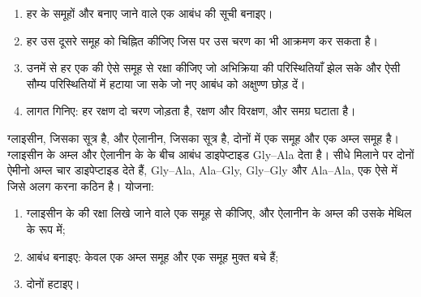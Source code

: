 \begin{method}[रक्षण की योजना]\label{met:g12:synthesis-strategy:plan}
\begin{enumerate}
  \item हर  के समूहों और बनाए जाने वाले एक आबंध की सूची बनाइए।
  \item हर उस दूसरे समूह को चिह्नित कीजिए जिस पर उस चरण का  भी
        आक्रमण कर सकता है।
  \item उनमें से हर एक की ऐसे समूह से रक्षा कीजिए जो अभिक्रिया की
        परिस्थितियाँ झेल सके और ऐसी सौम्य परिस्थितियों में हटाया जा सके जो
        नए आबंध को अक्षुण्ण छोड़ दें।
  \item लागत गिनिए: हर रक्षण दो चरण जोड़ता है, रक्षण और
        विरक्षण, और समग्र  घटाता है।
\end{enumerate}
\end{method}

\begin{example}[चार नहीं, एक डाइपेप्टाइड बनाना]\label{ex:g12:synthesis-strategy:dipeptide}
ग्लाइसीन, जिसका सूत्र  है, और ऐलानीन, जिसका सूत्र  है, दोनों में
एक  समूह और एक अम्ल समूह है। ग्लाइसीन के अम्ल और
ऐलानीन के  के बीच  आबंध डाइपेप्टाइड Gly--Ala देता है। सीधे
मिलाने पर दोनों ऐमीनो अम्ल चार डाइपेप्टाइड देते हैं, Gly--Ala, Ala--Gly,
Gly--Gly और Ala--Ala, एक ऐसे  में जिसे अलग करना कठिन है। योजना:
\begin{enumerate}
  \item ग्लाइसीन के  की रक्षा  लिखे जाने वाले एक समूह से कीजिए, और
        ऐलानीन के अम्ल की उसके मेथिल  के रूप में;
  \item {} आबंध बनाइए: केवल एक अम्ल समूह और एक  समूह
        मुक्त बचे हैं;
  \item दोनों  हटाइए।
\end{enumerate}
\end{example}

